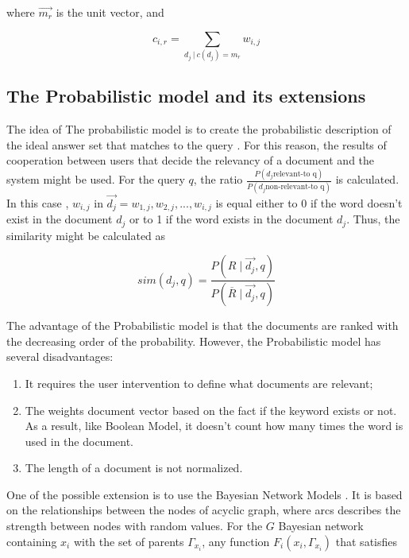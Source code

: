 \documentclass[paper=8.27in:11.69in, 12pt]{scrartcl}
\begin{document}
where \(\vec{m_{r}}\) is the unit vector, and

\[ c_{i, r} = \sum_{d_{j} \ | \ c(d_{j}) = m_{r} } w_{i, j} \]

\subsection{The Probabilistic model and its extensions}

The idea of The probabilistic model is to create the probabilistic description of the ideal answer set that matches to the query \cite{robertson1976relevance}. For this reason, the results of cooperation between users that decide the relevancy of a document and the system might be used. For the query $q$, the ratio \( \frac{P(d_{j} \text{relevant-to q} ) }{P(d_{j} \text{non-relevant-to q} ) } \) is calculated. In this case , \( w_{i, j} \) in \( \vec{d_{j}} = w_{1, j}, w_{2, j}, ... , w_{i, j} \) is equal either to 0 if the word doesn't exist in the document \( d_{j} \) or to 1 if the word exists in the document \( d_{j} \). Thus, the similarity might be calculated as 

\[ sim (d_{j}, q) = \frac{P(R \mid \vec{d_{j}}, q)}{P(\overline R \mid \vec{d_{j}}, q)} \]

The advantage of the Probabilistic model is that the documents are ranked with the decreasing order of the probability. However, the Probabilistic model has several disadvantages:

\begin{enumerate}

\item It requires the user intervention to define what documents are relevant;

\item The weights document vector based on the fact if the keyword exists or not. As a result, like Boolean Model, it doesn't count how many times the word is used in the document.

\item The length of a document is not normalized.

\end{enumerate}

One of the possible extension is to use the Bayesian Network Models \cite{turtle1991evaluation}. It is based on the relationships between the nodes of acyclic graph, where arcs describes the strength between nodes with random values. For the \( G \) Bayesian network containing \(x_{i}\) with the set of  parents \(\Gamma_{x_{i}}\), any function \(F_{i} \left (x_{i}, \Gamma_{x_{i}}  \right ) \) that satisfies
\end{document}
